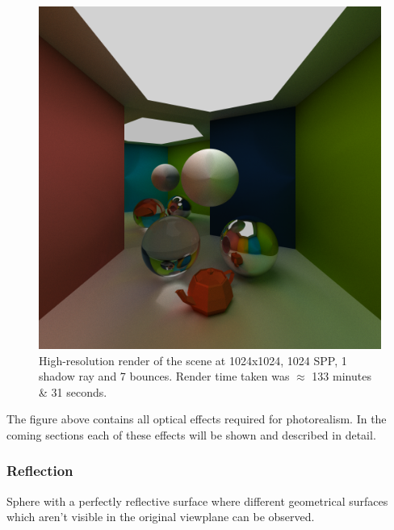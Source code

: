 \documentclass[a4paper, twocolumn]{article}
\begin{document}
            \begin{figure}[H]
                \centering
                \includegraphics[width=\linewidth]{share/the_render.png}
                \caption{High-resolution render of the scene at 1024x1024, 1024 SPP, 1 shadow ray and 7 bounces. Render time taken was \(\approx\) 133 minutes \& 31 seconds.}
                \label{fig:render}
            \end{figure}

            The figure above contains all optical effects required for photorealism. In the coming sections each of these effects will be shown and described in detail.

            \subsubsection*{Reflection}

            Sphere with a perfectly reflective surface where different geometrical surfaces which aren't visible in the original viewplane can be observed. 
\end{document}
